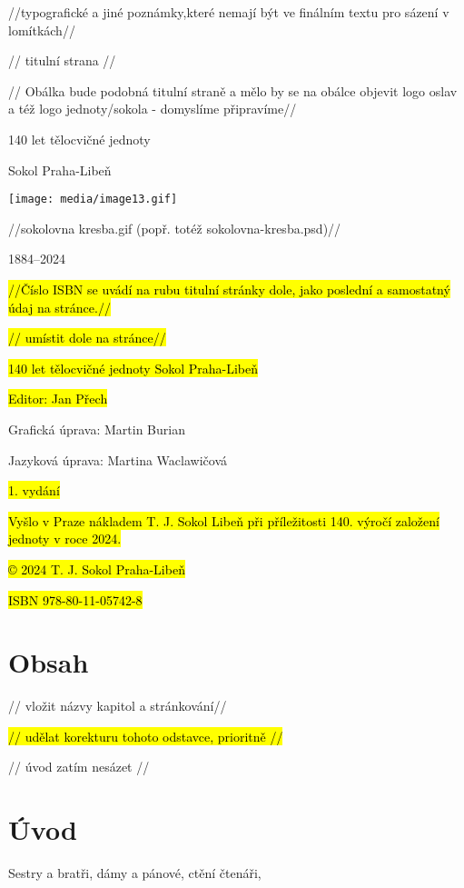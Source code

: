//typografické a jiné poznámky,které nemají být ve finálním textu pro
sázení v lomítkách//

// titulní strana //

// Obálka bude podobná titulní straně a mělo by se na obálce objevit
logo oslav a též logo jednoty/sokola - domyslíme připravíme//

140 let tělocvičné jednoty

Sokol Praha-Libeň

\texttt{[image: media/image13.gif]}

//sokolovna kresba.gif (popř. totéž sokolovna-kresba.psd)//

1884--2024

\hl{//Číslo ISBN se uvádí na rubu titulní stránky dole, jako poslední a
samostatný údaj na stránce.//}

\hl{// umístit dole na stránce//}

\hl{140 let tělocvičné jednoty Sokol Praha-Libeň}

\hl{Editor: Jan Přech}

Grafická úprava: Martin Burian

Jazyková úprava: Martina Waclawičová

\hl{1. vydání}

\hl{Vyšlo v Praze nákladem T. J. Sokol Libeň při příležitosti 140.
výročí založení jednoty v roce 2024.}

\hl{© 2024 T. J. Sokol Praha-Libeň}

\hl{ISBN 978-80-11-05742-8}

\section{Obsah}\label{obsah}

// vložit názvy kapitol a stránkování//

\hl{// udělat korekturu tohoto odstavce, prioritně //}

// úvod zatím nesázet //

\section{Úvod}\label{uxfavod}

Sestry a bratři, dámy a pánové, ctění čtenáři,

